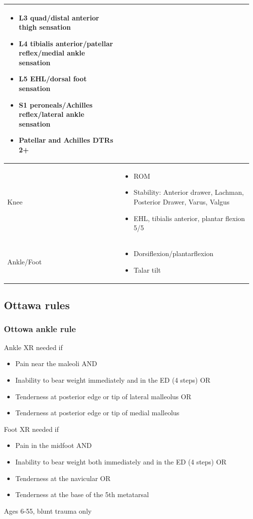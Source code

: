 \documentclass[8pt]{extarticle}
\begin{document}
\begin{tabularx}{\linewidth}{|X|X|}
\begin{itemize}[leftmargin=*]
        \item[] L3 quad/distal anterior thigh sensation
        \item[] L4 tibialis anterior/patellar reflex/medial ankle sensation
        \item[] L5 EHL/dorsal foot sensation
        \item[] S1 peroneals/Achilles reflex/lateral ankle sensation
        \item[] Patellar and Achilles DTRs 2+
    \end{itemize}\\
\hline
Knee & 
    \begin{itemize}[leftmargin=*]
        \item[] ROM
        \item[] Stability: Anterior drawer, Lachman, Posterior Drawer, Varus, Valgus
        \item[] EHL, tibialis anterior, plantar flexion 5/5
    \end{itemize}\\
\hline
Ankle/Foot & 
    \begin{itemize}[leftmargin=*]
        \item[] Dorsiflexion/plantarflexion
        \item[] Talar tilt
    \end{itemize}\\
\hline
\end{tabularx}

\subsection{Ottawa rules}
\subsubsection{Ottowa ankle rule}
Ankle XR needed if
    \begin{itemize}
        \item Pain near the maleoli AND
        \item Inability to bear weight immediately and in the ED (4 steps) OR
        \item Tenderness at posterior edge or tip of lateral malleolus OR
        \item Tenderness at posterior edge or tip of medial malleolus
    \end{itemize}
Foot XR needed if
    \begin{itemize}
        \item Pain in the midfoot AND
        \item Inability to bear weight both immediately and in the ED (4 steps) OR
        \item Tenderness at the navicular OR
        \item Tenderness at the base of the 5th metatarsal
    \end{itemize}
Ages 6-55, blunt trauma only
\end{document}
